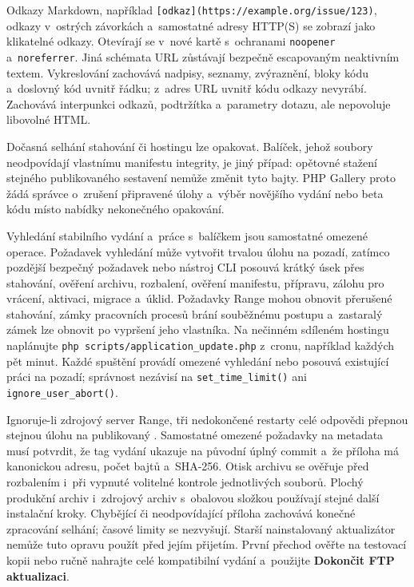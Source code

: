 \documentclass[11pt,a4paper]{article}
\newcommand{\filepath}[1]{\path{#1}}
\newcommand{\ui}[1]{\textbf{#1}}
\newcommand{\codeword}[1]{\nolinkurl{#1}}
\begin{document}
Odkazy Markdown, například \codeword{[odkaz](https://example.org/issue/123)},
odkazy v~ostrých závorkách a~samostatné adresy HTTP(S) se zobrazí jako
klikatelné odkazy. Otevírají se v~nové kartě s~ochranami \codeword{noopener}
a~\codeword{noreferrer}. Jiná schémata URL zůstávají bezpečně escapovaným
neaktivním textem. Vykreslování zachovává nadpisy, seznamy, zvýraznění, bloky
kódu a~doslovný kód uvnitř řádku; z~adres URL uvnitř kódu odkazy nevyrábí.
Zachovává interpunkci odkazů, podtržítka a~parametry dotazu, ale nepovoluje
libovolné HTML.


Dočasná selhání stahování či hostingu lze opakovat. Balíček, jehož soubory
neodpovídají vlastnímu manifestu integrity, je jiný případ: opětovné stažení
stejného publikovaného sestavení nemůže změnit tyto bajty. PHP Gallery proto
žádá správce o~zrušení připravené úlohy a~výběr novějšího vydání nebo beta kódu
místo nabídky nekonečného opakování.

Vyhledání stabilního vydání a~práce s~balíčkem jsou samostatné omezené operace.
Požadavek vyhledání může vytvořit trvalou úlohu na pozadí, zatímco pozdější
bezpečný požadavek nebo nástroj CLI posouvá krátký úsek přes stahování, ověření
archivu, rozbalení, ověření manifestu, přípravu, zálohu pro vrácení, aktivaci,
migrace a~úklid. Požadavky Range mohou obnovit přerušené stahování, zámky
pracovních procesů brání souběžnému postupu a~zastaralý zámek lze obnovit po
vypršení jeho vlastníka. Na nečinném sdíleném hostingu naplánujte
\codeword{php scripts/application_update.php} z~cronu, například každých pět
minut. Každé spuštění provádí omezené vyhledání nebo posouvá existující práci na
pozadí; správnost nezávisí na \codeword{set_time_limit()} ani
\codeword{ignore_user_abort()}.

Ignoruje-li zdrojový server Range, tři nedokončené restarty celé odpovědi
přepnou stejnou úlohu na publikovaný \filepath{production.zip}.
Samostatné omezené požadavky na metadata musí potvrdit, že tag vydání ukazuje
na původní úplný commit a~že příloha má kanonickou adresu, počet bajtů
a~SHA-256.
Otisk archivu se ověřuje před rozbalením i~při vypnuté volitelné kontrole
jednotlivých souborů. Plochý produkční archiv i~zdrojový archiv s~obalovou
složkou používají stejné další instalační kroky. Chybějící či neodpovídající
příloha zachovává konečné zpracování selhání; časové limity se nezvyšují.
Starší nainstalovaný aktualizátor nemůže tuto opravu použít před jejím přijetím.
První přechod ověřte na testovací kopii nebo ručně nahrajte celé kompatibilní
vydání a~použijte \ui{Dokončit FTP aktualizaci}.
\end{document}
